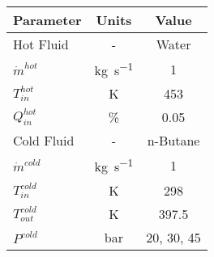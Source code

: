 \begin{tabular}{|p{2.5cm} c c|}
    \hline
    \rowcolor{bluepoli!40} %
    \textbf{Parameter} & \textbf{Units} & \textbf{Value} \T\B \\
    \hline \hline
    Hot Fluid & - & Water \T\B\\
    \(\Dot{m}^{hot}\) & \unit{\kg\per\s} & \num{1} \T\B\\
    \(T_{in}^{hot}\) & \unit{\K} & \num{453} \T\B\\
    \(Q_{in}^{hot}\) & \unit{\percent} & \num{0.05} \T\B\\
    \hline
    Cold Fluid & - & n-Butane \T\B\\
    \(\Dot{m}^{cold}\) & \unit{\kg\per\s} & \num{1} \T\B\\
    \(T_{in}^{cold}\) & \unit{\K} & \num{298} \T\B\\
    \(T_{out}^{cold}\) & \unit{\K} & \num{397.5} \T\B\\
    \(P^{cold}\) & \unit{\bar} & \num{20}, \num{30}, \num{45} \T\B\\
    \hline
\end{tabular}